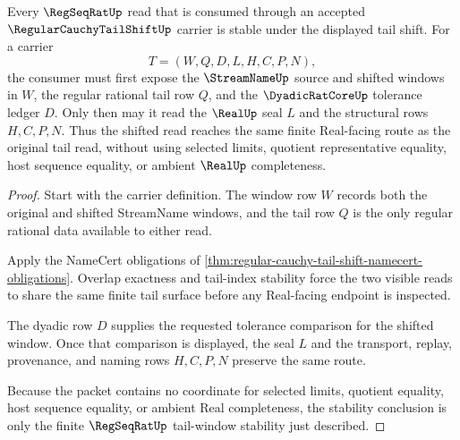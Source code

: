 \begin{theorem}
\label{thm:regular-cauchy-tail-shift-regseqrat-stability}
Every $\RegSeqRatUp$ read that is consumed through an accepted $\RegularCauchyTailShiftUp$ carrier is stable under the displayed tail shift. For a carrier
$$
T=(W,Q,D,L,H,C,P,N),
$$
the consumer must first expose the $\StreamNameUp$ source and shifted windows in $W$, the regular rational tail row $Q$, and the $\DyadicRatCoreUp$ tolerance ledger $D$. Only then may it read the $\RealUp$ seal $L$ and the structural rows $H,C,P,N$. Thus the shifted read reaches the same finite Real-facing route as the original tail read, without using selected limits, quotient representative equality, host sequence equality, or ambient $\RealUp$ completeness.
\end{theorem}
\begin{proof}
Start with the carrier definition. The window row $W$ records both the original and shifted StreamName windows, and the tail row $Q$ is the only regular rational data available to either read.

Apply the NameCert obligations of \autoref{thm:regular-cauchy-tail-shift-namecert-obligations}. Overlap exactness and tail-index stability force the two visible reads to share the same finite tail surface before any Real-facing endpoint is inspected.

The dyadic row $D$ supplies the requested tolerance comparison for the shifted window. Once that comparison is displayed, the seal $L$ and the transport, replay, provenance, and naming rows $H,C,P,N$ preserve the same route.

Because the packet contains no coordinate for selected limits, quotient equality, host sequence equality, or ambient Real completeness, the stability conclusion is only the finite $\RegSeqRatUp$ tail-window stability just described.
\end{proof}

